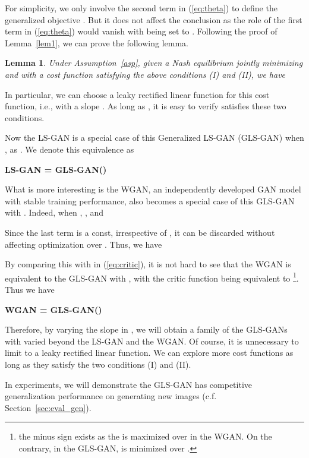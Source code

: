\documentclass[11pt,fullpage, letterpaper,twoside]{article}
\newtheorem{lemma}{Lemma}
\newcommand{\1}[1]{\mathds{1}_{\left[#1\right]}}
\begin{document}
For simplicity, we only involve the second term in (\ref{eq:theta}) to define the generalized objective . But it does not affect the conclusion as the role of the first term in (\ref{eq:theta}) would vanish with  being set to . Following the proof of Lemma~\ref{lem1}, we can prove the following lemma.
\begin{lemma}\label{lem5}
Under Assumption~\ref{asp}, given a Nash equilibrium  jointly minimizing  and  with a cost function  satisfying the above conditions (I) and (II), we have

\end{lemma}

In particular, we can choose a leaky rectified linear function for this cost function, i.e.,  with a slope . As long as , it is easy to verify  satisfies these two conditions.


Now the LS-GAN is a special case of this Generalized LS-GAN (GLS-GAN) when , as . We denote this equivalence as

\vspace{1mm}
\centerline{\bf LS-GAN = GLS-GAN()}
\vspace{1mm}

What is more interesting is the WGAN, an independently developed GAN model with stable training performance, also becomes a special case of this GLS-GAN with .  Indeed, when , , and

Since the last term  is a const, irrespective of , it can be discarded without affecting optimization over . Thus, we have


By comparing this  with  in (\ref{eq:critic}), it is not hard to see that the WGAN is equivalent to the GLS-GAN with , with the critic function  being equivalent to  \footnote{the minus sign exists as the  is maximized over  in the WGAN. On the contrary, in the GLS-GAN,  is minimized over .}. Thus we have

\vspace{1mm}\centerline{\bf WGAN = GLS-GAN()}\vspace{1mm}

Therefore, by varying the slope  in , we will obtain a family of the GLS-GANs with varied  beyond the LS-GAN and the WGAN.
Of course, it is unnecessary to limit  to a leaky rectified linear function. We can explore more cost functions as long as they satisfy the two conditions (I) and (II).

In experiments, we will demonstrate the GLS-GAN has competitive generalization performance on generating new images (c.f. Section~\ref{sec:eval_gen}).
\end{document}
